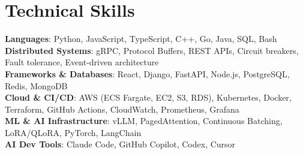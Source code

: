 \documentclass[letterpaper,11pt]{article}
\begin{document}
\section{Technical Skills}
\vspace{-7pt}
\begin{itemize}
[leftmargin=0.15in, label={}]\small{\item{
        \textbf{Languages}{: Python, JavaScript, TypeScript, C++, Go, Java, SQL, Bash} \\
        \textbf{Distributed Systems}{: gRPC, Protocol Buffers, REST APIs, Circuit breakers, Fault tolerance, Event-driven architecture} \\
        \textbf{Frameworks \& Databases}{: React, Django, FastAPI, Node.js, PostgreSQL, Redis, MongoDB} \\
        \textbf{Cloud \& CI/CD}{: AWS (ECS Fargate, EC2, S3, RDS), Kubernetes, Docker, Terraform, GitHub Actions, CloudWatch, Prometheus, Grafana} \\
        \textbf{ML \& AI Infrastructure}{: vLLM, PagedAttention, Continuous Batching, LoRA/QLoRA, PyTorch, LangChain} \\
        \textbf{AI Dev Tools}{: Claude Code, GitHub Copilot, Codex, Cursor} \\
}}
\end{itemize}
\end{document}
